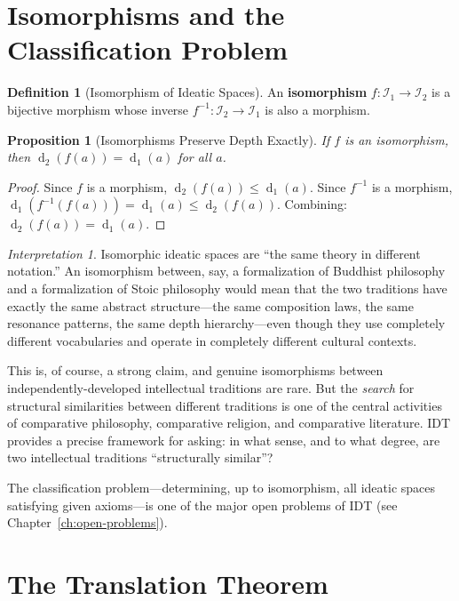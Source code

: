 \documentclass[11pt,openany]{book}
\theoremstyle{definition}
\newtheorem{definition}[axiom]{Definition}
\theoremstyle{plain}
\newtheorem{proposition}[axiom]{Proposition}
\theoremstyle{remark}
\newtheorem{interpretation}[axiom]{Interpretation}
\newcommand{\IS}{\mathcal{I}}               %
\newcommand{\depth}{\operatorname{d}}       %
\begin{document}
\section{Isomorphisms and the Classification Problem}

\begin{definition}[Isomorphism of Ideatic Spaces]
An \textbf{isomorphism} $f : \IS_1 \to \IS_2$ is a bijective morphism whose inverse $f^{-1} : \IS_2 \to \IS_1$ is also a morphism.
\end{definition}

\begin{proposition}[Isomorphisms Preserve Depth Exactly]
If $f$ is an isomorphism, then $\depth_2(f(a)) = \depth_1(a)$ for all $a$.
\end{proposition}

\begin{proof}
Since $f$ is a morphism, $\depth_2(f(a)) \leq \depth_1(a)$. Since $f^{-1}$ is a morphism, $\depth_1(f^{-1}(f(a))) = \depth_1(a) \leq \depth_2(f(a))$. Combining: $\depth_2(f(a)) = \depth_1(a)$.
\end{proof}

\begin{interpretation}
Isomorphic ideatic spaces are ``the same theory in different notation.'' An isomorphism between, say, a formalization of Buddhist philosophy and a formalization of Stoic philosophy would mean that the two traditions have exactly the same abstract structure---the same composition laws, the same resonance patterns, the same depth hierarchy---even though they use completely different vocabularies and operate in completely different cultural contexts.

This is, of course, a strong claim, and genuine isomorphisms between independently-developed intellectual traditions are rare. But the \emph{search} for structural similarities between different traditions is one of the central activities of comparative philosophy, comparative religion, and comparative literature. IDT provides a precise framework for asking: in what sense, and to what degree, are two intellectual traditions ``structurally similar''?

The classification problem---determining, up to isomorphism, all ideatic spaces satisfying given axioms---is one of the major open problems of IDT (see Chapter~\ref{ch:open-problems}).
\end{interpretation}

\section{The Translation Theorem}
\end{document}
